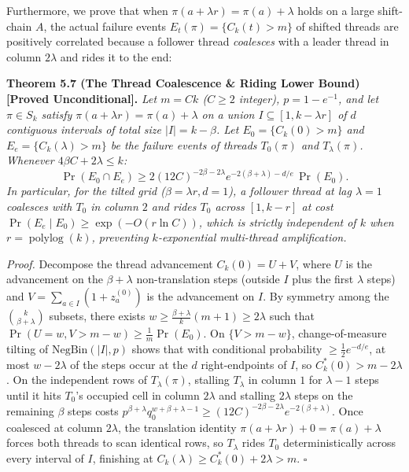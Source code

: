 \documentclass[
  11pt,
]{article}
\begin{document}
Furthermore, we prove that when \(\pi(a + \lambda r) = \pi(a) + \lambda\) holds on a large shift-chain \(A\), the actual failure events \(E_t(\pi) = \{C_k(t) > m\}\) of shifted threads are positively correlated because a follower thread \emph{coalesces} with a leader thread in column \(2\lambda\) and rides it to the end:

\textbf{Theorem 5.7 (The Thread Coalescence \& Riding Lower Bound) [Proved Unconditional].}
\emph{Let \(m = C k\) (\(C \ge 2\) integer), \(p = 1 - e^{-1}\), and let \(\pi \in S_k\) satisfy \(\pi(a + \lambda r) = \pi(a) + \lambda\) on a union \(I \subseteq [1, k - \lambda r]\) of \(d\) contiguous intervals of total size \(|I| = k - \beta\). Let \(E_0 = \{C_k(0) > m\}\) and \(E_e = \{C_k(\lambda) > m\}\) be the failure events of threads \(T_0(\pi)\) and \(T_\lambda(\pi)\). Whenever \(4\beta C + 2\lambda \le k\):}
\begin{equation}
\Pr(E_0 \cap E_e) \ge 2 \left(12 C\right)^{-2\beta - 2\lambda} e^{-2(\beta + \lambda) - d/e} \, \Pr(E_0).
\end{equation}
\emph{In particular, for the tilted grid (\(\beta = \lambda r, d = 1\)), a follower thread at lag \(\lambda = 1\) coalesces with \(T_0\) in column \(2\) and rides \(T_0\) across \([1, k-r]\) at cost \(\Pr(E_e \mid E_0) \ge \exp(-O(r \ln C))\), which is strictly independent of \(k\) when \(r = \operatorname{polylog}(k)\), preventing \(k\)-exponential multi-thread amplification.}

\emph{Proof.} Decompose the thread advancement \(C_k(0) = U + V\), where \(U\) is the advancement on the \(\beta + \lambda\) non-translation steps (outside \(I\) plus the first \(\lambda\) steps) and \(V = \sum_{a \in I} (1 + z_a^{(0)})\) is the advancement on \(I\). By symmetry among the \(\binom{k}{\beta+\lambda}\) subsets, there exists \(w \ge \frac{\beta+\lambda}{k}(m+1) \ge 2\lambda\) such that \(\Pr(U = w, V > m - w) \ge \frac{1}{m}\Pr(E_0)\). On \(\{V > m - w\}\), change-of-measure tilting of \(\mathrm{NegBin}(|I|, p)\) shows that with conditional probability \(\ge \frac{1}{2} e^{-d/e}\), at most \(w - 2\lambda\) of the steps occur at the \(d\) right-endpoints of \(I\), so \(C_k^*(0) > m - 2\lambda\). On the independent rows of \(T_\lambda(\pi)\), stalling \(T_\lambda\) in column \(1\) for \(\lambda - 1\) steps until it hits \(T_0\)'s occupied cell in column \(2\lambda\) and stalling \(2\lambda\) steps on the remaining \(\beta\) steps costs \(p^{\beta+\lambda} q_0^{w + \beta + \lambda - 1} \ge (12C)^{-2\beta-2\lambda} e^{-2(\beta+\lambda)}\). Once coalesced at column \(2\lambda\), the translation identity \(\pi(a + \lambda r) + 0 = \pi(a) + \lambda\) forces both threads to scan identical rows, so \(T_\lambda\) rides \(T_0\) deterministically across every interval of \(I\), finishing at \(C_k(\lambda) \ge C_k^*(0) + 2\lambda > m\). \(\square\)
\end{document}
